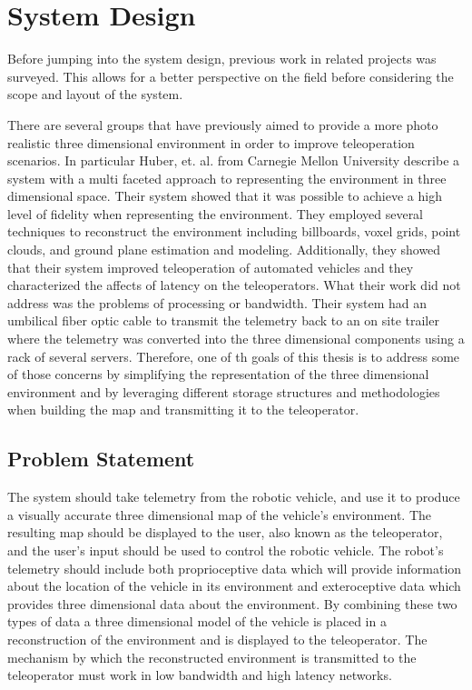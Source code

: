 \documentclass[12pt]{report}
\begin{document}

\chapter{System Design}\label{chap:system_design}
Before jumping into the system design, previous work in related projects was surveyed.  This allows for a better perspective on the field before considering the scope and layout of the system.

There are several groups that have previously aimed to provide a more photo realistic three dimensional environment in order to improve teleoperation scenarios.  In particular Huber, et. al. from Carnegie Mellon University describe a system with a multi faceted approach to representing the environment in three dimensional space\cite{photo_real}.  Their system showed that it was possible to achieve a high level of fidelity when representing the environment.  They employed several techniques to reconstruct the environment including billboards, voxel grids, point clouds, and ground plane estimation and modeling.  Additionally, they showed that their system improved teleoperation of automated vehicles and they characterized the affects of latency on the teleoperators.  What their work did not address was the problems of processing or bandwidth.  Their system had an umbilical fiber optic cable to transmit the telemetry back to an on site trailer where the telemetry was converted into the three dimensional components using a rack of several servers.  Therefore, one of th goals of this thesis is to address some of those concerns by simplifying the representation of the three dimensional environment and by leveraging different storage structures and methodologies when building the map and transmitting it to the teleoperator.

\section{Problem Statement}
The system should take telemetry from the robotic vehicle, and use it to produce a visually accurate three dimensional map of the vehicle's environment.  The resulting map should be displayed to the user, also known as the teleoperator, and the user's input should be used to control the robotic vehicle.  The robot's telemetry should include both proprioceptive data which will provide information about the location of the vehicle in its environment and exteroceptive data which provides three dimensional data about the environment.  By combining these two types of data a three dimensional model of the vehicle is placed in a reconstruction of the environment and is displayed to the teleoperator.  The mechanism by which the reconstructed environment is transmitted to the teleoperator must work in low bandwidth and high latency networks.
\end{document}
